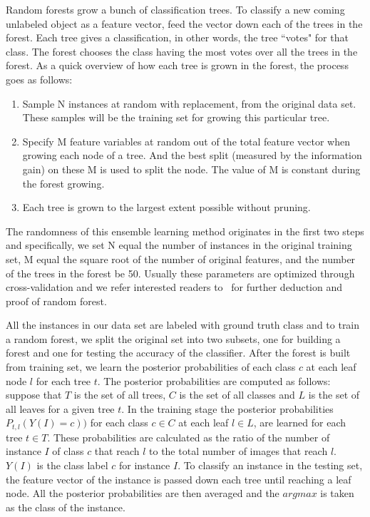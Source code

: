 Random forests grow a bunch of classification trees. To classify a new coming unlabeled object as a feature vector, 
feed the vector down each of the trees in the forest. Each tree gives a classification, in other words, the 
tree ``votes" for that class. The forest chooses the class having the most votes over all the trees in the forest. 
As a quick overview of how each tree is grown in the forest, the process goes as follows:
\begin{enumerate}
\item Sample N instances at random with replacement, from the original data set. These samples will be the training set for growing this particular tree.
\item Specify M feature variables at random out of the total feature vector when growing each node of a tree. And the best split (measured by the information gain) on these M is used to split the node. The value of M is constant during the forest growing.
\item Each tree is grown to the largest extent possible without pruning.
\end{enumerate}
The randomness of this ensemble learning method originates in the first two steps and specifically, we set N equal the number of instances in the original training set, M equal the square root of the
number of original features, and the number of the trees in the forest be 50. Usually these parameters are optimized
through cross-validation and we refer interested readers to~\cite{RF} for further deduction and proof of random forest.

All the instances in our data set are labeled with ground truth class and to train a random forest, we split the original set into two subsets, one for building a forest and one for testing the accuracy of the classifier. After the forest is built from training set, we learn the posterior probabilities of each class $c$ at each leaf node $l$ for each tree $t$. The posterior probabilities are computed as follows: suppose that $T$ is the set of all trees, $C$ is the set of all classes and $L$ is the set of all leaves for a given tree $t$. In the training stage the posterior probabilities $P_{t,l}(Y(I) = c))$ for each class $c\in C$ at each leaf $l\in L$, are learned for each tree $t\in T$. These probabilities are calculated as the ratio of the number of instance $I$ of class $c$ that reach $l$ to the total number of images that reach $l$. $Y(I)$ is the class label $c$ for instance $I$. To classify an instance in the testing set, the feature vector of the instance is passed down each tree until reaching a leaf node. All the posterior probabilities are then averaged and the $argmax$ is taken as the class of the instance. 

